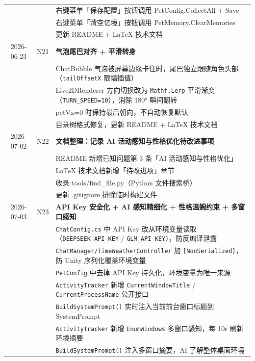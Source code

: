 \documentclass[12pt,a4paper]{ctexart}
\begin{document}
\begin{table}[H]
\begin{tabular}{cl>{\raggedright\arraybackslash}p{}}
           &       & 右键菜单「保存配置」按钮调用 PetConfig.CollectAll + Save\\
           &       & 右键菜单「清空忆境」按钮调用 PetMemory.ClearMemories\\
           &       & 更新 README + LaTeX 技术文档\\
2026-06-23 & N21  & \textbf{气泡尾巴对齐 + 平滑转身}\\
           &       & ChatBubble 气泡被屏幕边缘卡住时，尾巴独立跟随角色头部（\texttt{tailOffsetX} 限幅插值）\\
           &       & Live2DRenderer 方向切换改为 \texttt{Mathf.Lerp} 平滑渐变（\texttt{TURN\_SPEED=10}），消除 180° 瞬间翻转\\
           &       & petVx=0 时保持最后朝向，不自动恢复默认\\
           &       & 目录树格式修复，更新 README + LaTeX 技术文档\\
2026-07-02 & N22  & \textbf{文档整理：记录 AI 活动感知与性格优化待改进事项}\\
           &       & README 新增已知问题第 3 条「AI 活动感知与性格优化」\\
           &       & LaTeX 技术文档新增「待改进项」章节\\
           &       & 收录 tools/find\_file.py（Python 文件搜索桥）\\
           &       & 更新 .gitignore 排除临时构建文件\\
2026-07-03 & N23  & \textbf{API Key 安全化 + AI 感知精细化 + 性格温婉约束 + 多窗口感知}\\
           &       & \texttt{ChatConfig.cs} 中 API Key 改从环境变量读取（\texttt{DEEPSEEK\_API\_KEY} / \texttt{GLM\_API\_KEY}），防反编译泄露\\
           &       & \texttt{ChatManager/TimeWeatherController} 加 \texttt{[NonSerialized]}，防 Unity 序列化覆盖环境变量\\
           &       & \texttt{PetConfig} 中去掉 API Key 持久化，环境变量为唯一来源\\
           &       & \texttt{ActivityTracker} 新增 \texttt{CurrentWindowTitle} / \texttt{CurrentProcessName} 公开接口\\
           &       & \texttt{BuildSystemPrompt()} 实时注入当前前台窗口标题到 SystemPrompt\\
           &       & \texttt{ActivityTracker} 新增 \texttt{EnumWindows} 多窗口感知，每 10s 刷新环境摘要\\
           &       & \texttt{BuildSystemPrompt()} 注入多窗口摘要，AI 了解整体桌面环境\\

\end{tabular}
\end{table}
\end{document}
